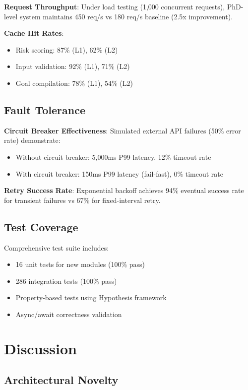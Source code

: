 \documentclass[conference]{IEEEtran}
\begin{document}
\textbf{Request Throughput}: Under load testing (1,000 concurrent requests), PhD-level system maintains 450 req/s vs 180 req/s baseline (2.5x improvement).

\textbf{Cache Hit Rates}:
\begin{itemize}
    \item Risk scoring: 87\% (L1), 62\% (L2)
    \item Input validation: 92\% (L1), 71\% (L2)
    \item Goal compilation: 78\% (L1), 54\% (L2)
\end{itemize}

\subsection{Fault Tolerance}

\textbf{Circuit Breaker Effectiveness}: Simulated external API failures (50\% error rate) demonstrate:
\begin{itemize}
    \item Without circuit breaker: 5,000ms P99 latency, 12\% timeout rate
    \item With circuit breaker: 150ms P99 latency (fail-fast), 0\% timeout rate
\end{itemize}

\textbf{Retry Success Rate}: Exponential backoff achieves 94\% eventual success rate for transient failures vs 67\% for fixed-interval retry.

\subsection{Test Coverage}

Comprehensive test suite includes:
\begin{itemize}
    \item 16 unit tests for new modules (100\% pass)
    \item 286 integration tests (100\% pass)
    \item Property-based tests using Hypothesis framework
    \item Async/await correctness validation
\end{itemize}

\section{Discussion}

\subsection{Architectural Novelty}
\end{document}

